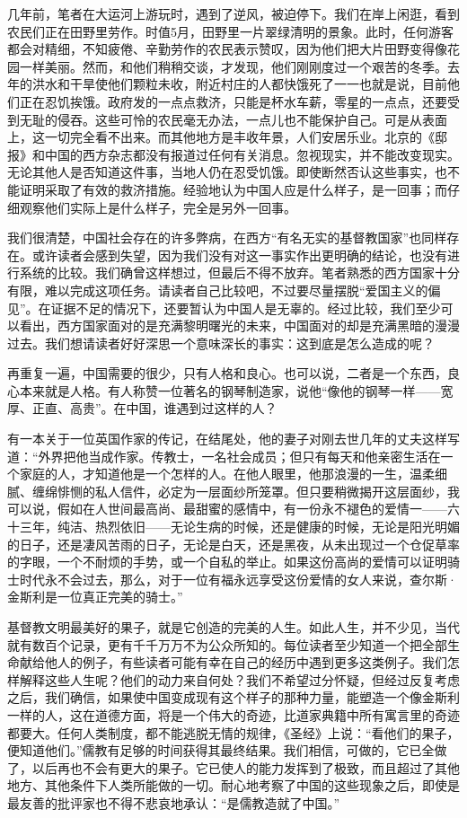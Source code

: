 \documentclass[12pt,oneside]{book}
\begin{document}
\begin{common-format}
几年前，笔者在大运河上游玩时，遇到了逆风，被迫停下。我们在岸上闲逛，看到农民们正在田野里劳作。时值5月，田野里一片翠绿清明的景象。此时，任何游客都会对精细，不知疲倦、辛勤劳作的农民表示赞叹，因为他们把大片田野变得像花园一样美丽。然而，和他们稍稍交谈，才发现，他们刚刚度过一个艰苦的冬季。去年的洪水和干旱使他们颗粒未收，附近村庄的人都快饿死了一一也就是说，目前他们正在忍饥挨饿。政府发的一点点救济，只能是杯水车薪，零星的一点点，还要受到无耻的侵吞。这些可怜的农民毫无办法，一点儿也不能保护自己。可是从表面上，这一切完全看不出来。而其他地方是丰收年景，人们安居乐业。北京的《邸报》和中国的西方杂志都没有报道过任何有关消息。忽视现实，并不能改变现实。无论其他人是否知道这件事，当地人仍在忍受饥饿。即使断然否认这些事实，也不能证明采取了有效的救济措施。经验地认为中国人应是什么样子，是一回事；而仔细观察他们实际上是什么样子，完全是另外一回事。 

我们很清楚，中国社会存在的许多弊病，在西方“有名无实的基督教国家”也同样存在。或许读者会感到失望，因为我们没有对这一事实作出更明确的结论，也没有进行系统的比较。我们确曾这样想过，但最后不得不放弃。笔者熟悉的西方国家十分有限，难以完成这项任务。请读者自己比较吧，不过要尽量摆脱“爱国主义的偏见”。在证据不足的情况下，还要暂认为中国人是无辜的。经过比较，我们至少可以看出，西方国家面对的是充满黎明曙光的未来，中国面对的却是充满黑暗的漫漫过去。我们想请读者好好深思一个意味深长的事实：这到底是怎么造成的呢？ 

再重复一遍，中国需要的很少，只有人格和良心。也可以说，二者是一个东西，良心本来就是人格。有人称赞一位著名的钢琴制造家，说他“像他的钢琴一样——宽厚、正直、高贵”。在中国，谁遇到过这样的人？ 

有一本关于一位英国作家的传记，在结尾处，他的妻子对刚去世几年的丈夫这样写道：“外界把他当成作家。传教士，一名社会成员；但只有每天和他亲密生活在一个家庭的人，才知道他是一个怎样的人。在他人眼里，他那浪漫的一生，温柔细腻、缠绵悱恻的私人信件，必定为一层面纱所笼罩。但只要稍微揭开这层面纱，我可以说，假如在人世间最高尚、最甜蜜的感情中，有一份永不褪色的爱情一——六十三年，纯洁、热烈依旧——无论生病的时候，还是健康的时候，无论是阳光明媚的日子，还是凄风苦雨的日子，无论是白天，还是黑夜，从未出现过一个仓促草率的字眼，一个不耐烦的手势，或一个自私的举止。如果这份高尚的爱情可以证明骑士时代永不会过去，那么，对于一位有福永远享受这份爱情的女人来说，查尔斯·金斯利是一位真正完美的骑士。” 

基督教文明最美好的果子，就是它创造的完美的人生。如此人生，并不少见，当代就有数百个记录，更有千千万万不为公众所知的。每位读者至少知道一个把全部生命献给他人的例子，有些读者可能有幸在自己的经历中遇到更多这类例子。我们怎样解释这些人生呢？他们的动力来自何处？我们不希望过分怀疑，但经过反复考虑之后，我们确信，如果使中国变成现有这个样子的那种力量，能塑造一个像金斯利一样的人，这在道德方面，将是一个伟大的奇迹，比道家典籍中所有寓言里的奇迹都要大。任何人类制度，都不能逃脱无情的规律，《圣经》上说：“看他们的果子，便知道他们。”儒教有足够的时间获得其最终结果。我们相信，可做的，它已全做了，以后再也不会有更大的果子。它已使人的能力发挥到了极致，而且超过了其他地方、其他条件下人类所能做的一切。耐心地考察了中国的这些现象之后，即使是最友善的批评家也不得不悲哀地承认：“是儒教造就了中国。” 


\end{common-format}
\end{document}
